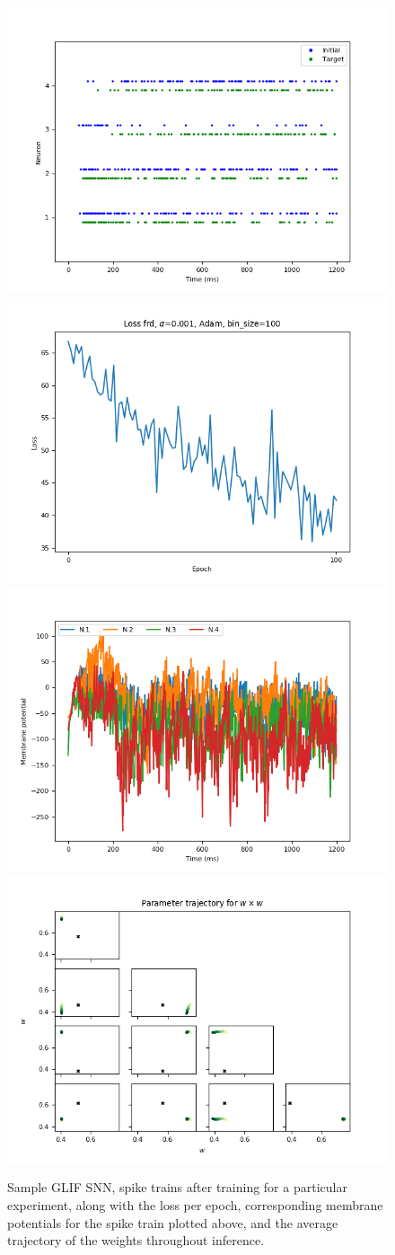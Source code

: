 \documentclass[mphil,deptreport,ianc]{infthesis} %
\begin{document}
\begin{figure}
    \centering
    \includegraphics[width=0.5\columnwidth]{figures/samples/GLIF/12-09_16-14-54-627/spike_trains_train_iter_100.png}
    \includegraphics[width=0.49\columnwidth]{figures/samples/GLIF/12-09_16-14-54-627/plot_loss_test12-09_16-16-45-54312-09_16-16-45-543.png}
    \includegraphics[width=0.5\columnwidth]{figures/samples/GLIF/12-09_16-14-54-627/membrane_pots_train_i_100.png}
    \includegraphics[width=0.49\columnwidth]{figures/samples/GLIF/12-09_16-14-54-627/test_weights_inference_trajectories_param_w.png}
    
    \caption{Sample GLIF SNN, spike trains after training for a particular experiment, along with the loss per epoch, corresponding membrane potentials for the spike train plotted above, and the average trajectory of the weights throughout inference.}
    \label{fig:sample_GLIF_exp}
\end{figure}
\end{document}
